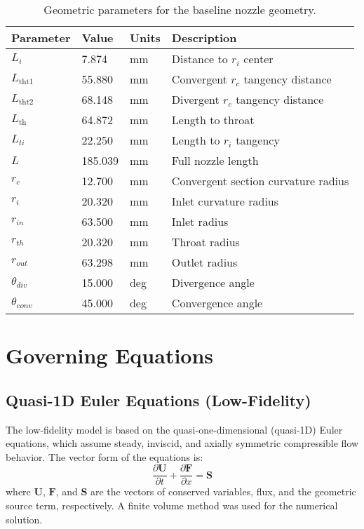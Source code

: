 \documentclass[dscexam, EN]{ufabcFHZh}
\begin{document}
\begin{table}[h!]
  \centering
  \caption{Geometric parameters for the baseline nozzle geometry.}
  \label{tab:geom_params_tese_en}
  \begin{tabular}{ l J{3.3}{3} l l }
    \toprule
    \textbf{Parameter} & \textbf{Value} & \textbf{Units} & \textbf{Description} \\
    \midrule
    $L_i$             & 7.874   & mm  & Distance to $r_i$ center  \\
    $L_{\text{tht1}}$ & 55.880  & mm  & Convergent $r_c$ tangency distance  \\
    $L_{\text{tht2}}$ & 68.148  & mm  & Divergent $r_c$ tangency distance  \\
    $L_{\text{th}}$   & 64.872  & mm  & Length to throat  \\
    $L_{ti}$          & 22.250  & mm  & Length to $r_i$ tangency  \\
    $L$               & 185.039 & mm  & Full nozzle length  \\
    $r_c$             & 12.700  & mm  & Convergent section curvature radius  \\
    $r_i$             & 20.320  & mm  & Inlet curvature radius  \\
    $r_{in}$          & 63.500  & mm  & Inlet radius  \\
    $r_{th}$          & 20.320  & mm  & Throat radius  \\
    $r_{out}$         & 63.298  & mm  & Outlet radius  \\
    $\theta_{div}$    & 15.000  & deg & Divergence angle  \\
    $\theta_{conv}$   & 45.000  & deg & Convergence angle  \\
    \bottomrule
  \end{tabular}
\end{table}

\section{Governing Equations}

\subsection{Quasi-1D Euler Equations (Low-Fidelity)}
The low-fidelity model is based on the quasi-one-dimensional (quasi-1D) Euler equations, which assume steady, inviscid, and axially symmetric compressible flow behavior. The vector form of the equations is:
\begin{equation}
    \frac{\partial \mathbf{U}}{\partial t} + \frac{\partial \mathbf{F}}{\partial x} = \mathbf{S}
\end{equation}
where $\mathbf{U}$, $\mathbf{F}$, and $\mathbf{S}$ are the vectors of conserved variables, flux, and the geometric source term, respectively. A finite volume method was used for the numerical solution.
\end{document}
